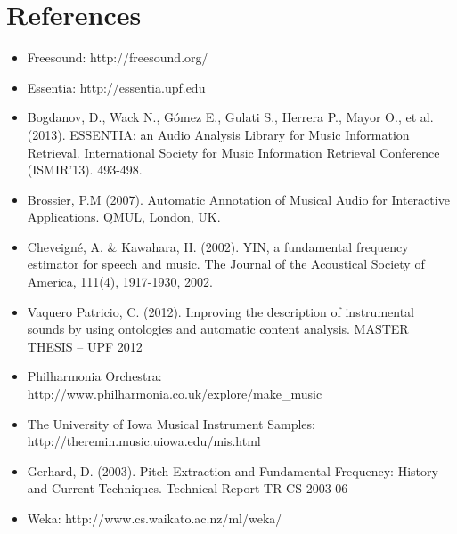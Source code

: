 \documentclass{proc}
\begin{document}
\section{References}
\begin{itemize}
    \item Freesound: http://freesound.org/
    \item Essentia: http://essentia.upf.edu
    \item Bogdanov, D., Wack N., Gómez E., Gulati S., Herrera P., Mayor O., et al. (2013). ESSENTIA: an Audio Analysis Library for Music Information Retrieval. International Society for Music Information Retrieval Conference (ISMIR'13). 493-498.
    \item Brossier, P.M (2007). Automatic Annotation of Musical Audio for Interactive Applications. QMUL, London, UK.
    \item Cheveigné, A. \& Kawahara, H. (2002). YIN, a fundamental frequency estimator for speech and music. The Journal of the Acoustical Society of America, 111(4), 1917-1930, 2002.
    \item Vaquero Patricio, C. (2012). Improving the description of instrumental sounds by using ontologies and automatic content analysis. MASTER THESIS – UPF 2012
    \item Philharmonia Orchestra: http://www.philharmonia.co.uk/explore/make\_music
    \item The University of Iowa Musical Instrument Samples: http://theremin.music.uiowa.edu/mis.html
    \item Gerhard, D. (2003). Pitch Extraction and Fundamental Frequency: History and Current Techniques. Technical Report TR-CS 2003-06
    \item Weka: http://www.cs.waikato.ac.nz/ml/weka/
\end{itemize}

\appendix
\end{document}
